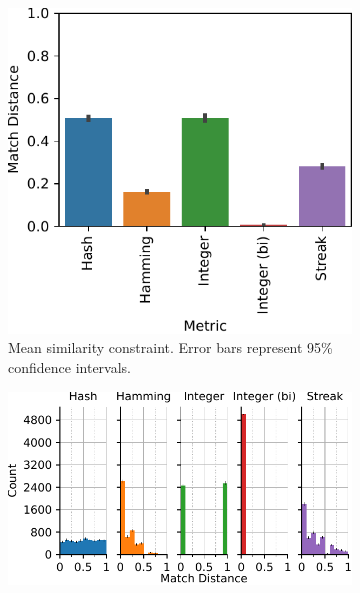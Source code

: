 \begin{figure}[!htbp]
\begin{center}
\begin{subfigure}[b]{\linewidth}
\begin{minipage}{0.6\linewidth}
\includegraphics[width=\linewidth]{img/sphere/bitweight=0dot5+seed=1+title=dimensionality_barplot+_data_hathash_hash=c0f6c5cf854ff253+_script_fullcat_hash=a3db428966bb187a+ext=}
\end{minipage}
\begin{minipage}{0.35\linewidth}
\caption{
Mean similarity constraint.
Error bars represent 95\% confidence intervals.
}
\label{fig:sphere_barplot}
\end{minipage}
\end{subfigure}
\begin{minipage}{\linewidth}
\begin{subfigure}[b]{\linewidth}
\centering
\includegraphics[width=\linewidth]{img/sphere/bitweight=0dot5+seed=1+title=dimensionality_distnplot+viz=hist+_data_hathash_hash=c0f6c5cf854ff253+_script_fullcat_hash=290cd520ead87cd0+ext=}

\end{subfigure}
\end{minipage}
\end{center}
\end{figure}

